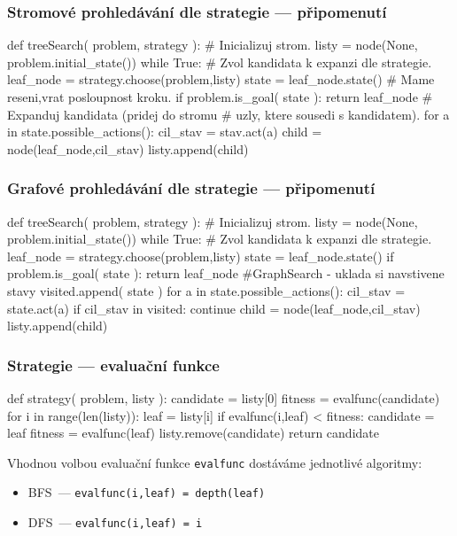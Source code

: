 \documentclass[red,handout,professionalfont]{beamer}
\theoremstyle{definition}
\newcommand{\0}{\mbox{${\bf 0}$}}
\begin{document}
\begin{frame}[fragile]\frametitle{Stromové prohledávání dle strategie --- připomenutí}
\begin{python}
def treeSearch( problem, strategy ):
    # Inicializuj strom.
    listy = node(None, problem.initial_state())
    while True:
      # Zvol kandidata k expanzi dle strategie.
      leaf_node = strategy.choose(problem,listy)
      state = leaf_node.state()
      # Mame reseni,vrat posloupnost kroku.
      if problem.is_goal( state ):
        return leaf_node
      # Expanduj kandidata (pridej do stromu 
      # uzly, ktere sousedi s kandidatem).
      for a in state.possible_actions():
        cil_stav = stav.act(a)
        child = node(leaf_node,cil_stav)
        listy.append(child)
\end{python}
\end{frame}
\begin{frame}[fragile]\frametitle{Grafové prohledávání dle strategie --- připomenutí}
\begin{python}
def treeSearch( problem, strategy ):
    # Inicializuj strom.
    listy = node(None, problem.initial_state())
    while True:
      # Zvol kandidata k expanzi dle strategie.
      leaf_node = strategy.choose(problem,listy)
      state = leaf_node.state()
      if problem.is_goal( state ):
        return leaf_node
      #GraphSearch - uklada si navstivene stavy
      visited.append( state )
      for a in state.possible_actions():
        cil_stav = state.act(a)
        if cil_stav in visited:
          continue
        child = node(leaf_node,cil_stav)
        listy.append(child)
\end{python}
\end{frame}

\begin{frame}[fragile]\frametitle{Strategie --- evaluační funkce}
\begin{python}
def strategy( problem, listy ):
    candidate = listy[0]
    fitness = evalfunc(candidate)
    for i in range(len(listy)):
      leaf = listy[i]
      if evalfunc(i,leaf) <  fitness:
          candidate = leaf
          fitness = evalfunc(leaf)
    listy.remove(candidate)
    return candidate
\end{python}\pause
Vhodnou volbou evaluační funkce {\tt evalfunc} dostáváme jednotlivé algoritmy:\pause
\begin{itemize} 
 \item BFS\pause\ --- {\tt evalfunc(i,leaf) = depth(leaf)}\pause
 \item DFS\pause\ --- {\tt evalfunc(i,leaf) = i}
\end{itemize}
\end{frame}
\end{document}
